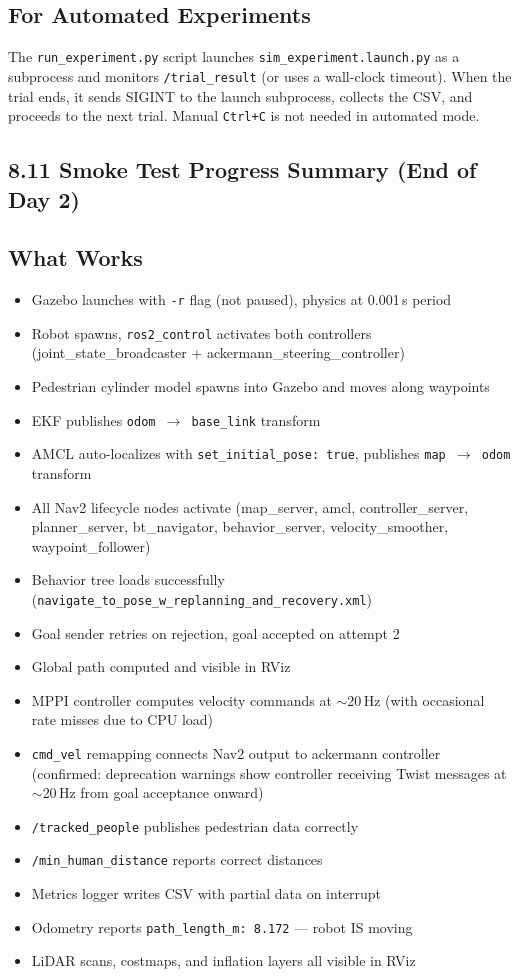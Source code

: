 \documentclass[11pt]{article}
\newcommand{\logentry}[1]{\subsection*{#1}}
\begin{document}
\logentry{For Automated Experiments}
The \texttt{run\_experiment.py} script launches \texttt{sim\_experiment.launch.py}
as a subprocess and monitors \texttt{/trial\_result} (or uses a wall-clock
timeout). When the trial ends, it sends SIGINT to the launch subprocess,
collects the CSV, and proceeds to the next trial. Manual \texttt{Ctrl+C} is
not needed in automated mode.


\subsection*{8.11 Smoke Test Progress Summary (End of Day 2)}

\logentry{What Works}
\begin{itemize}
  \item Gazebo launches with \texttt{-r} flag (not paused), physics at 0.001\,s
    period
  \item Robot spawns, \texttt{ros2\_control} activates both controllers
    (joint\_state\_broadcaster + ackermann\_steering\_controller)
  \item Pedestrian cylinder model spawns into Gazebo and moves along waypoints
  \item EKF publishes \texttt{odom $\to$ base\_link} transform
  \item AMCL auto-localizes with \texttt{set\_initial\_pose: true}, publishes
    \texttt{map $\to$ odom} transform
  \item All Nav2 lifecycle nodes activate (map\_server, amcl, controller\_server,
    planner\_server, bt\_navigator, behavior\_server, velocity\_smoother,
    waypoint\_follower)
  \item Behavior tree loads successfully (\texttt{navigate\_to\_pose\_w\_replanning\_and\_recovery.xml})
  \item Goal sender retries on rejection, goal accepted on attempt 2
  \item Global path computed and visible in RViz
  \item MPPI controller computes velocity commands at $\sim$20\,Hz (with
    occasional rate misses due to CPU load)
  \item \texttt{cmd\_vel} remapping connects Nav2 output to ackermann controller
    (confirmed: deprecation warnings show controller receiving Twist messages
    at $\sim$20\,Hz from goal acceptance onward)
  \item \texttt{/tracked\_people} publishes pedestrian data correctly
  \item \texttt{/min\_human\_distance} reports correct distances
  \item Metrics logger writes CSV with partial data on interrupt
  \item Odometry reports \texttt{path\_length\_m: 8.172} --- robot IS moving
  \item LiDAR scans, costmaps, and inflation layers all visible in RViz
\end{itemize}
\end{document}
